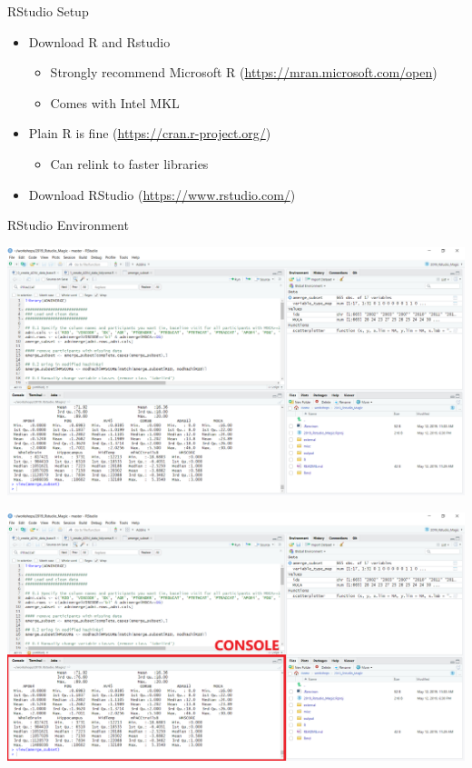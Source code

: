 \documentclass[
  ignorenonframetext,
]{beamer}
\providecommand{\tightlist}{%
  \setlength{\itemsep}{0pt}\setlength{\parskip}{0pt}}
\begin{document}
\begin{frame}{RStudio Setup}
\protect\hypertarget{rstudio-setup}{}

\begin{itemize}[<+->]
\tightlist
\item
  Download R and Rstudio

  \begin{itemize}[<+->]
  \tightlist
  \item
    Strongly recommend Microsoft R
    (\url{https://mran.microsoft.com/open})
  \item
    Comes with Intel MKL
  \end{itemize}
\item
  Plain R is fine (\url{https://cran.r-project.org/})

  \begin{itemize}[<+->]
  \tightlist
  \item
    Can relink to faster libraries
  \end{itemize}
\item
  Download RStudio (\url{https://www.rstudio.com/})
\end{itemize}

\end{frame}

\begin{frame}{RStudio Environment}
\protect\hypertarget{rstudio-environment}{}

\includegraphics{../external/images/rstudio_terminal_0.PNG}

\end{frame}

\begin{frame}

\includegraphics{../external/images/rstudio_terminal_1_CONSOLE.png}

\end{frame}
\end{document}
